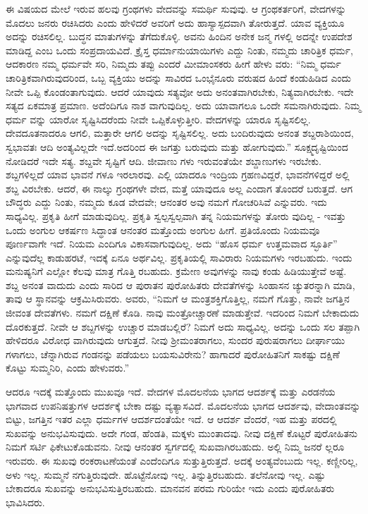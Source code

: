 ಈ ವಿಷಯದ ಮೇಲೆ ಇರುವ ಹಲವು ಗ್ರಂಥಗಳು ವೇದವನ್ನು ಸಮರ್ಥಿ ಸುವುವು. ಆ ಗ್ರಂಥಕರ್ತರಿಗೆ, ವೇದಗಳನ್ನು ಮೊದಲು ಜನರು ರಚಿಸಿದರು ಎಂದು ಹೇಳಿದರೆ ಅವರಿಗೆ ಅದು ಹಾಸ್ಯಾಸ್ಪದವಾಗಿ ತೋರುತ್ತದೆ. ಯಾವ ವ್ಯಕ್ತಿಯೂ ಅದನ್ನು ರಚಿಸಲಿಲ್ಲ. ಬುದ್ಧನ ಮಾತುಗಳನ್ನು ತೆಗೆದುಕೊಳ್ಳಿ. ಅವನು ಹಿಂದಿನ ಅನೇಕ ಜನ್ಮ ಗಳಲ್ಲಿ ಅದನ್ನೇ ಉಪದೇಶ ಮಾಡಿದ್ದ ಎಂಬ ಒಂದು ಸಂಪ್ರದಾಯವಿದೆ. ಕ್ರೈಸ್ತ ಧರ್ಮಾನುಯಾಯಿಗಳು ಎದ್ದು ನಿಂತು, ನಮ್ಮದು ಚಾರಿತ್ರಿಕ ಧರ್ಮ, ಆದಕಾರಣ ನಮ್ಮ ಧರ್ಮವೇ ಸರಿ, ನಿಮ್ಮದು ತಪ್ಪು ಎಂದರೆ ಮೀಮಾಂಸಕರು ಹೀಗೆ ಹೇಳು ವರು: “ನಿಮ್ಮ ಧರ್ಮ ಚಾರಿತ್ರಿಕವಾಗಿರುವುದರಿಂದ, ಒಬ್ಬ ವ್ಯಕ್ತಿಯು ಅದನ್ನು ಸಾವಿರದ ಒಂಭೈನೂರು ವರುಷದ ಹಿಂದೆ ಕಂಡುಹಿಡಿದ ಎಂದು ನೀವೇ ಒಪ್ಪಿ ಕೊಂಡಂತಾಗುವುದು. ಆದರೆ ಯಾವುದು ಸತ್ಯವೋ ಅದು ಅನಂತವಾಗಿರಬೇಕು, ನಿತ್ಯವಾಗಿರಬೇಕು. ಇದೇ ಸತ್ಯದ ಏಕಮಾತ್ರ ಪ್ರಮಾಣ. ಅದೆಂದಿಗೂ ನಾಶ ವಾಗುವುದಿಲ್ಲ. ಅದು ಯಾವಾಗಲೂ ಒಂದೇ ಸಮನಾಗಿರುವುದು. ನಿಮ್ಮ ಧರ್ಮ ವನ್ನು ಯಾರೋ ಸೃಷ್ಟಿಸಿದರೆಂದು ನೀವೇ ಒಪ್ಪಿಕೊಳ್ಳುತ್ತೀರಿ. ವೇದಗಳನ್ನು ಯಾರೂ ಸೃಷ್ಟಿಸಲಿಲ್ಲ. ದೇವದೂತನಾದರೂ ಆಗಲಿ, ಮತ್ತಾರೇ ಆಗಲಿ ಅದನ್ನು ಸೃಷ್ಟಿಸಲಿಲ್ಲ. ಅದು ಬಂದಿರುವುದು ಅನಂತ ಶಬ್ದರಾಶಿಯಿಂದ, ಸ್ವಭಾವತಃ ಆದಿ ಅಂತ್ಯವಿಲ್ಲದೇ ಇದೆ.ಅದರಿಂದ ಈ ಜಗತ್ತು ಬರುವುದು ಮತ್ತು ಹೋಗುವುದು.” ಸೂಕ್ಷ್ಮದೃಷ್ಟಿಯಿಂದ ನೋಡಿದರೆ ಇದೇ ಸತ್ಯ. ಶಬ್ದವೇ ಸೃಷ್ಟಿಗೆ ಆದಿ. ಜೀವಾಣು ಗಳು ಇರುವಂತೆಯೇ ಶಬ್ದಾಣುಗಳು ಇರಬೇಕು. ಶಬ್ದಗಳಿಲ್ಲದೆ ಯಾವ ಭಾವನೆ ಗಳೂ ಇರಲಾರವು. ಎಲ್ಲಿ ಯಾದರೂ ಇಂದ್ರಿಯ ಗ್ರಹಣವಿದ್ದರೆ, ಭಾವನೆಗಳಿದ್ದರೆ ಅಲ್ಲಿ ಶಬ್ದ ವಿರಬೇಕು. ಆದರೆ, ಈ ನಾಲ್ಕು ಗ್ರಂಥಗಳೇ ವೇದ, ಮತ್ತೆ ಯಾವುದೂ ಅಲ್ಲ ಎಂದಾಗ ತೊಂದರೆ ಬರುತ್ತದೆ. ಆಗ ಬೌದ್ಧರು ಎದ್ದು ನಿಂತು, ನಮ್ಮದು ಕೂಡ ವೇದವೇ; ಆನಂತರ ಅವು ನಮಗೆ ಗೋಚರಿಸಿವೆ ಎನ್ನುವರು. ಇದು ಸಾಧ್ಯವಿಲ್ಲ. ಪ್ರಕೃತಿ ಹೀಗೆ ಮಾಡುವುದಿಲ್ಲ. ಪ್ರಕೃತಿ ಸ್ವಲ್ಪಸ್ವಲ್ಪವಾಗಿ ತನ್ನ ನಿಯಮಗಳನ್ನು ತೋರು ವುದಿಲ್ಲ - ಇವತ್ತು ಒಂದು ಅಂಗುಲ ಆಕರ್ಷಣ ಸಿದ್ಧಾಂತ ಆನಂತರ ಮತ್ತೊಂದು ಅಂಗುಲ ಹೀಗೆ. ಪ್ರತಿಯೊಂದು ನಿಯಮವೂ ಪೂರ್ಣವಾಗೇ ಇದೆ. ನಿಯಮ ಎಂದಿಗೂ ವಿಕಾಸವಾಗುವುದಿಲ್ಲ. ಅದು “ಹೊಸ ಧರ್ಮ ಉತ್ತಮವಾದ ಸ್ಛೂರ್ತಿ” ಎನ್ನುವುದೆಲ್ಲ ಕಾಡುಹರಟೆ, ಇದಕ್ಕೆ ಏನೂ ಅರ್ಥವಿಲ್ಲ. ಪ್ರಕೃತಿಯಲ್ಲಿ ಸಾವಿರಾರು ನಿಯಮಗಳು ಇರಬಹುದು. ಇಂದು ಮನುಷ್ಯನಿಗೆ ಎಲ್ಲೋ ಕೆಲವು ಮಾತ್ರ ಗೊತ್ತಿ ರಬಹುದು. ಕ್ರಮೇಣ ಅವುಗಳನ್ನು ನಾವು ಕಂಡು ಹಿಡಿಯುತ್ತೇವೆ ಅಷ್ಟೆ. ಶಬ್ದ ಅನಂತ ವಾದುದು ಎಂದು ಸಾರಿದ ಆ ಪುರಾತನ ಪುರೋಹಿತರು ದೇವತೆಗಳನ್ನು ಸಿಂಹಾಸನ ಚ್ಯುತರನ್ನಾಗಿ ಮಾಡಿ, ತಾವು ಆ ಸ್ಥಾನವನ್ನು ಆಕ್ರಮಿಸಿರುವರು. ಅವರು, “ನಿಮಗೆ ಆ ಮಂತ್ರಶಕ್ತಿಗೊತ್ತಿಲ್ಲ, ನಮಗೆ ಗೊತ್ತು, ನಾವೇ ಜಗತ್ತಿನ ಜೀವಂತ ದೇವತೆಗಳು. ನಮಗೆ ದಕ್ಷಿಣೆ ಕೊಡಿ. ನಾವು ಮಂತ್ರೋಚ್ಚಾರಣೆ ಮಾಡುತ್ತೇವೆ. ಇದರಿಂದ ನಿಮಗೆ ಬೇಕಾದುದು ದೊರಕುತ್ತದೆ. ನೀವೇ ಆ ಶಬ್ದಗಳನ್ನು ಉಚ್ಚಾರ ಮಾಡಬಲ್ಲಿರೆ? ನಿಮಗೆ ಅದು ಸಾಧ್ಯವಿಲ್ಲ. ಅದನ್ನು ಒಂದು ಸಲ ತಪ್ಪಾಗಿ ಹೇಳಿದರೂ ವಿರೋಧ ವಾಗಿರುವುದು ಆಗುತ್ತದೆ. ನೀವು ಶ‍್ರೀಮಂತರಾಗಲು, ಸುಂದರ ಪುರುಷರಾಗಲು ದೀರ್ಘಾಯು ಗಳಾಗಲು, ಚೆನ್ನಾಗಿರುವ ಗಂಡನನ್ನು ಪಡೆಯಲು ಬಯಸುವಿರೇನು? ಹಾಗಾದರೆ ಪುರೋಹಿತನಿಗೆ ಸಾಕಷ್ಟು ದಕ್ಷಿಣೆ ಕೊಟ್ಟು ಸುಮ್ಮನಿರಿ, ಎಂದು ಹೇಳುವರು.”

ಆದರೂ ಇದಕ್ಕೆ ಮತ್ತೊಂದು ಮುಖವೂ ಇದೆ. ವೇದಗಳ ಮೊದಲನೆಯ ಭಾಗದ ಆದರ್ಶಕ್ಕೆ ಮತ್ತು ಎರಡನೆಯ ಭಾಗವಾದ ಉಪನಿಷತ್ತುಗಳ ಆದರ್ಶಕ್ಕೆ ಬೇಕಾ ದಷ್ಟು ವ್ಯತ್ಯಾಸವಿದೆ. ಮೊದಲನೆಯ ಭಾಗದ ಆದರ್ಶವು, ವೇದಾಂತವನ್ನು ಬಿಟ್ಟು, ಜಗತ್ತಿನ ಇತರ ಎಲ್ಲಾ ಧರ್ಮಗಳ ಆದರ್ಶದಂತೆಯೇ ಇದೆ. ಆ ಆದರ್ಶ ವೆಂದರೆ, ಇಹ ಮತ್ತು ಪರದಲ್ಲಿ ಸುಖವನ್ನು ಅನುಭವಿಸುವುದು. ಅದೇ ಗಂಡ, ಹೆಂಡತಿ, ಮಕ್ಕಳು ಮುಂತಾದವು. ನೀವು ದಕ್ಷಿಣೆ ಕೊಟ್ಟರೆ ಪುರೋಹಿತನು ನಿಮಗೆ ಸರ್ಟಿ ಫಿಕೇಟುಕೊಡುವನು. ನೀವು ಆನಂತರ ಸ್ವರ್ಗದಲ್ಲಿ ಸುಖವಾಗಿರಬಹುದು. ಅಲ್ಲಿ ನಿಮ್ಮ ಜನರೆ ಲ್ಲರೂ ಇರುವರು. ಈ ಸುಖವು ರಂಕರಾಟಣೆಯಂತೆ  ಎಂದೆಂದಿಗೂ ಸುತ್ತುತ್ತಿರುತ್ತದೆ. ಅದಕ್ಕೆ ಅಂತ್ಯವೆಂಬುದು ಇಲ್ಲ. ಕಣ್ಣೀರಿಲ್ಲ, ಅಳು ಇಲ್ಲ. ಸುಮ್ಮನೆ ನಗುತ್ತಿರುವುದೇ. ಹೊಟ್ಟೆನೋವು ಇಲ್ಲ. ತಿನ್ನುತ್ತಿರಬಹುದು. ತಲೆನೋವು ಇಲ್ಲ. ಎಷ್ಟು ಬೇಕಾದರೂ ಸುಖವನ್ನು ಅನುಭವಿಸುತ್ತಿರಬಹುದು. ಮಾನವನ ಪರಮ ಗುರಿಯೇ ಇದು ಎಂದು ಪುರೋಹಿತರು ಭಾವಿಸಿದರು.

